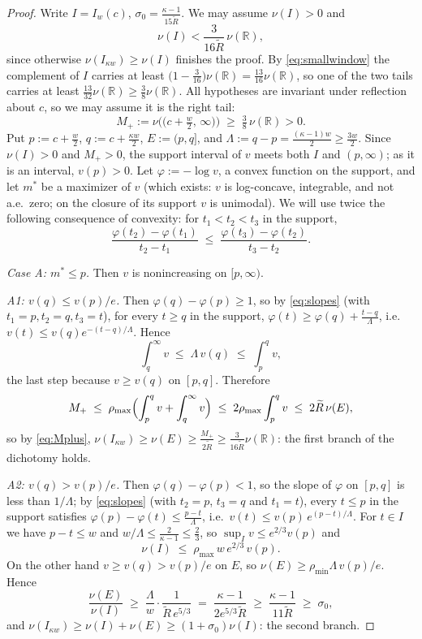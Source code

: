 \documentclass[11pt]{article}
\newcommand{\R}{\mathbb{R}}
\begin{document}
\begin{proof}
Write $I=I_w(c)$, $\sigma_0=\frac{\kappa-1}{15\widetilde R}$.  We may assume
$\nu(I)>0$ and
\begin{equation}\label{eq:smallwindow}
\nu(I)<\frac{3}{16\widetilde R}\,\nu(\R),
\end{equation}
since otherwise $\nu(I_{\kappa w})\ge\nu(I)$ finishes the proof.  By
\eqref{eq:smallwindow} the complement of $I$ carries at least
$\bigl(1-\frac{3}{16}\bigr)\nu(\R)=\frac{13}{16}\nu(\R)$, so one of the two tails
carries at least $\frac{13}{32}\nu(\R)\ge\frac38\nu(\R)$.  All hypotheses are
invariant under reflection about $c$, so we may assume it is the right tail:
\begin{equation}\label{eq:Mplus}
M_+:=\nu\bigl(\bigl(c+\tfrac w2,\,\infty\bigr)\bigr)\;\ge\;\tfrac38\,\nu(\R)>0 .
\end{equation}
Put $p:=c+\frac w2$, $q:=c+\frac{\kappa w}2$, $E:=(p,q]$, and
$\Lambda:=q-p=\frac{(\kappa-1)w}2\ge\frac{3w}2$.  Since $\nu(I)>0$ and $M_+>0$, the
support interval of $v$ meets both $I$ and $(p,\infty)$; as it is an interval,
$v(p)>0$.  Let $\varphi:=-\log v$, a convex function on the support, and let
$m^*$ be a maximizer of $v$ (which exists: $v$ is log-concave, integrable, and not
a.e.\ zero; on the closure of its support $v$ is unimodal).  We will use twice the
following consequence of convexity: for $t_1<t_2<t_3$ in the support,
\begin{equation}\label{eq:slopes}
\frac{\varphi(t_2)-\varphi(t_1)}{t_2-t_1}\;\le\;
\frac{\varphi(t_3)-\varphi(t_2)}{t_3-t_2}.
\end{equation}

\medskip\noindent\emph{Case A: $m^*\le p$.}  Then $v$ is nonincreasing on
$[p,\infty)$.

\emph{A1: $v(q)\le v(p)/e$.}  Then $\varphi(q)-\varphi(p)\ge1$, so by
\eqref{eq:slopes} (with $t_1=p,t_2=q,t_3=t$), for every $t\ge q$ in the support,
$\varphi(t)\ge\varphi(q)+\frac{t-q}{\Lambda}$, i.e.\
$v(t)\le v(q)e^{-(t-q)/\Lambda}$.  Hence
\[
\int_q^\infty v\;\le\;\Lambda\,v(q)\;\le\;\int_p^q v,
\]
the last step because $v\ge v(q)$ on $[p,q]$.  Therefore
\[
M_+\;\le\;\rho_{\max}\Bigl(\int_p^qv+\int_q^\infty v\Bigr)
\;\le\;2\rho_{\max}\int_p^qv
\;\le\;2\widetilde R\,\nu(E),
\]
so by \eqref{eq:Mplus},
$\nu(I_{\kappa w})\ge\nu(E)\ge\frac{M_+}{2\widetilde R}\ge\frac{3}{16\widetilde R}\nu(\R)$:
the first branch of the dichotomy holds.

\emph{A2: $v(q)>v(p)/e$.}  Then $\varphi(q)-\varphi(p)<1$, so the slope of
$\varphi$ on $[p,q]$ is less than $1/\Lambda$; by \eqref{eq:slopes} (with
$t_2=p$, $t_3=q$ and $t_1=t$), every $t\le p$ in the support satisfies
$\varphi(p)-\varphi(t)\le\frac{p-t}{\Lambda}$, i.e.\
$v(t)\le v(p)\,e^{(p-t)/\Lambda}$.  For $t\in I$ we have $p-t\le w$ and
$w/\Lambda\le\frac2{\kappa-1}\le\frac23$, so
$\sup_Iv\le e^{2/3}v(p)$ and
\[
\nu(I)\;\le\;\rho_{\max}\,w\,e^{2/3}\,v(p).
\]
On the other hand $v\ge v(q)>v(p)/e$ on $E$, so
$\nu(E)\ge\rho_{\min}\Lambda\,v(p)/e$.  Hence
\[
\frac{\nu(E)}{\nu(I)}\;\ge\;\frac{\Lambda}{w}\cdot\frac{1}{\widetilde R\,e^{5/3}}
\;=\;\frac{\kappa-1}{2e^{5/3}\widetilde R}\;\ge\;\frac{\kappa-1}{11\widetilde R}
\;\ge\;\sigma_0,
\]
and $\nu(I_{\kappa w})\ge\nu(I)+\nu(E)\ge(1+\sigma_0)\nu(I)$: the second branch.


\end{proof}
\end{document}
